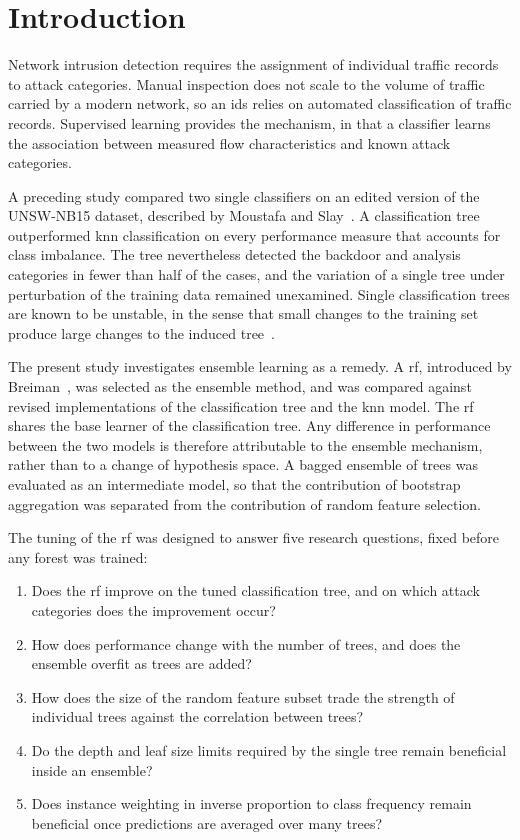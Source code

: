 \section{Introduction}
\label{sec:intro}

Network intrusion detection requires the assignment of individual traffic
records to attack categories. Manual inspection does not scale to the volume
of traffic carried by a modern network, so an \gls{ids} relies on automated
classification of traffic records. Supervised learning provides the
mechanism, in that a classifier learns the association between measured
flow characteristics and known attack categories.

A preceding study compared two single classifiers on an edited version of the
UNSW-NB15 dataset, described by Moustafa and Slay~\cite{moustafa2015}. A
classification tree outperformed \gls{knn} classification on every
performance measure that accounts for class imbalance. The tree nevertheless
detected the backdoor and analysis categories in fewer than half of the
cases, and the variation of a single tree under perturbation of the training
data remained unexamined. Single classification trees are known to be unstable,
in the sense that small changes to the training set produce large changes to
the induced tree~\cite{breiman1996}.

The present study investigates ensemble learning as a remedy. A \gls{rf},
introduced by Breiman~\cite{breiman2001}, was selected as the ensemble
method, and was compared against revised implementations of the
classification tree and the \gls{knn} model. The \gls{rf} shares the base
learner of the classification tree. Any difference in performance between
the two models is therefore attributable to the ensemble mechanism, rather
than to a change of hypothesis space. A bagged ensemble of trees was
evaluated as an intermediate model, so that the contribution of bootstrap
aggregation was separated from the contribution of random feature selection.

The tuning of the \gls{rf} was designed to answer five research questions,
fixed before any forest was trained:
\begin{enumerate}
\item Does the \gls{rf} improve on the tuned classification tree, and on
which attack categories does the improvement occur?
\item How does performance change with the number of trees, and does the
ensemble overfit as trees are added?
\item How does the size of the random feature subset trade the strength of
individual trees against the correlation between trees?
\item Do the depth and leaf size limits required by the single tree remain
beneficial inside an ensemble?
\item Does instance weighting in inverse proportion to class frequency remain
beneficial once predictions are averaged over many trees?
\end{enumerate}


